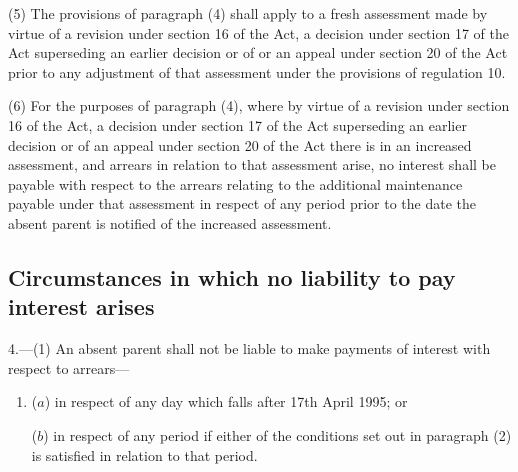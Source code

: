 \documentclass[12pt,a4paper]{article}
\begin{document}
{(5) The provisions of paragraph (4) shall apply to a fresh assessment 
made by virtue of a revision under section 16 of the Act, a decision under section 17 of the Act superseding an earlier decision or of  %
or an appeal under section 20 of the Act prior to any adjustment of that assessment under the provisions of regulation 10.

(6) For the purposes of paragraph (4), where 
by virtue of a revision under section 16 of the Act, a decision under section 17 of the Act superseding an earlier decision or of an appeal under section 20 of the Act there is  %
in an increased assessment, and arrears in relation to that assessment arise, no interest shall be payable with respect to the arrears relating to the additional maintenance payable under that assessment in respect of any period prior to the date the absent parent is notified of the increased assessment.


\subsection[4. Circumstances in which no liability to pay interest arises]{Circumstances in which no liability to pay interest arises}

4.—(1) An absent parent shall not be liable to make payments of interest 
with respect to arrears—
\begin{enumerate}\item[]
($a$) in respect of any day which falls after 17th April 1995; or

($b$) in respect of any period if either of the conditions set out in paragraph (2) is satisfied in relation to that period.
\end{enumerate}  %

}
\end{document}
